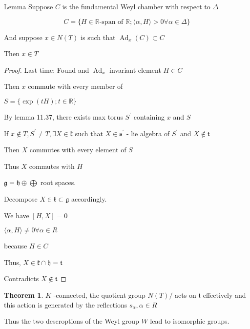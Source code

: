 \documentclass{article}
\theoremstyle{definition}
\newtheorem{theorem}{Theorem}
\newcommand{\Ad}{\operatorname{Ad}}
\begin{document}
\hrulefill

\underline{Lemma} Suppose \(C\) is the fundamental Weyl chamber with respect to \(\Delta\) 

\[
    C = \{ H\in \mathbb{R} \text{-span of } \mathbb{R} ; \langle \alpha , H \rangle > 0 \forall \alpha \in \Delta \} 
\]

And suppose \(x\in N(T)\) is such that \(\Ad_x(C) \subset C\)  

Then \(x\in T\) 

\begin{proof}
    Last time: Found and \(\Ad_x\) invariant element \(H\in C\) 

    Then \(x\) commute with every member of

    \(S = \{ \exp(tH) ; t\in \mathbb{R} \} \)
    
    By lemma 11.37, there exists max torus \(S^{\prime} \) containing \(x\) and \(S\) 

    If \(x\notin T, S^{\prime} \neq T, \exists X\in \mathfrak{k}\) such that \(X\in \mathfrak{s}^{\prime}\) - lie algebra of \(S^{\prime}\) and \(X\notin \mathfrak{t}\)
    
    Then \(X\) commutes with every element of \(S\) 

    Thus \(X\) commutes with \(H\) 

    \(\mathfrak{g} = \mathfrak{h} \oplus \bigoplus\) root spaces.
    
    Decompose \(X\in \mathfrak{k} \subset \mathfrak{g}\) accordingly.
    
    We have \([H,X] = 0\)
    
    \(\langle \alpha , H \rangle \neq 0 \forall \alpha \in R \)
    
    because \(H\in C\) 

    Thus, \(X\in \mathfrak{k} \cap \mathfrak{h} = \mathfrak{t} \)
    
    Contradicts \(X\notin \mathfrak{t}\)
    
\end{proof}

\begin{theorem}
    \(K\) -connected, the quotient group \(N(T) / \) acts on \(\mathfrak{t}\) effectively and this action is generated by the reflections \(s_\alpha , \alpha \in R\) 
    
    Thus the two descroptions of the Weyl group \(W\) lead to isomorphic groups.
\end{theorem}
\end{document}
